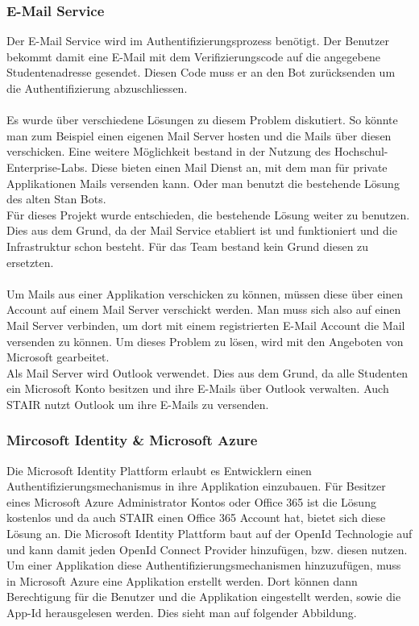 \documentclass[a4paper, table]{article}
\begin{document}
\subsubsection{E-Mail Service}
Der E-Mail Service wird im Authentifizierungsprozess benötigt.
Der Benutzer bekommt damit eine E-Mail mit dem Verifizierungscode auf die angegebene Studentenadresse gesendet.
Diesen Code muss er an den Bot zurücksenden um die Authentifizierung abzuschliessen.\\\\
Es wurde über verschiedene Lösungen zu diesem Problem diskutiert.
So könnte man zum Beispiel einen eigenen Mail Server hosten und die Mails über diesen verschicken.
Eine weitere Möglichkeit bestand in der Nutzung des Hochschul-Enterprise-Labs.
Diese bieten einen Mail Dienst an, mit dem man für private Applikationen Mails versenden kann.
Oder man benutzt die bestehende Lösung des alten Stan Bots.\\
Für dieses Projekt wurde entschieden, die bestehende Lösung weiter zu benutzen.
Dies aus dem Grund, da der Mail Service etabliert ist und funktioniert und die Infrastruktur schon besteht.
Für das Team bestand kein Grund diesen zu ersetzten.\\\\
Um Mails aus einer Applikation verschicken zu können, müssen diese über einen Account auf einem Mail Server verschickt werden.
Man muss sich also auf einen Mail Server verbinden, um dort mit einem registrierten E-Mail Account die Mail versenden zu können.
Um dieses Problem zu lösen, wird mit den Angeboten von Microsoft gearbeitet.\\
Als Mail Server wird Outlook verwendet.
Dies aus dem Grund, da alle Studenten ein Microsoft Konto besitzen und ihre E-Mails über Outlook verwalten.
Auch STAIR nutzt Outlook um ihre E-Mails zu versenden.

\subsubsection*{Mircosoft Identity \& Microsoft Azure}
Die Microsoft Identity Plattform erlaubt es Entwicklern einen Authentifizierungsmechanismus in ihre Applikation einzubauen.
Für Besitzer eines Microsoft Azure Administrator Kontos oder Office 365 ist die Lösung kostenlos und da auch STAIR einen Office 365 Account hat,
bietet sich diese Lösung an.
Die Microsoft Identity Plattform baut auf der OpenId Technologie auf und kann damit jeden OpenId Connect Provider hinzufügen, bzw. diesen nutzen.
Um einer Applikation diese Authentifizierungsmechanismen hinzuzufügen, muss in Microsoft Azure eine Applikation erstellt werden.
Dort können dann Berechtigung für die Benutzer und die Applikation eingestellt werden, sowie die App-Id herausgelesen werden. \autocite{noauthor_introduction_nodate}
Dies sieht man auf folgender Abbildung.
\end{document}
